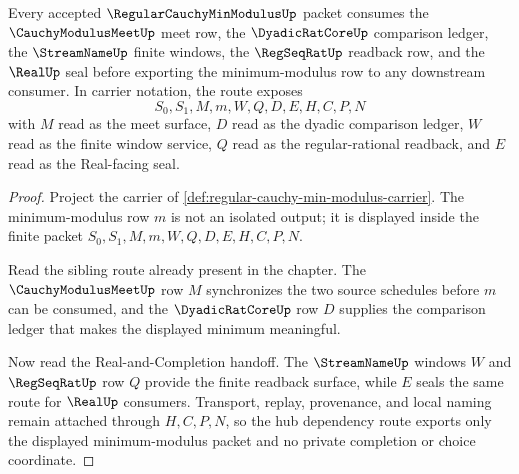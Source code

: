 \begin{theorem}
\label{thm:regular-cauchy-min-modulus-hub-route}
Every accepted $\RegularCauchyMinModulusUp$ packet consumes the $\CauchyModulusMeetUp$ meet row, the $\DyadicRatCoreUp$ comparison ledger, the $\StreamNameUp$ finite windows, the $\RegSeqRatUp$ readback row, and the $\RealUp$ seal before exporting the minimum-modulus row to any downstream consumer. In carrier notation, the route exposes
$$
S_0,S_1,M,m,W,Q,D,E,H,C,P,N
$$
with $M$ read as the meet surface, $D$ read as the dyadic comparison ledger, $W$ read as the finite window service, $Q$ read as the regular-rational readback, and $E$ read as the Real-facing seal.
\end{theorem}
\begin{proof}
Project the carrier of \autoref{def:regular-cauchy-min-modulus-carrier}. The minimum-modulus row $m$ is not an isolated output; it is displayed inside the finite packet $S_0,S_1,M,m,W,Q,D,E,H,C,P,N$.

Read the sibling route already present in the chapter. The $\CauchyModulusMeetUp$ row $M$ synchronizes the two source schedules before $m$ can be consumed, and the $\DyadicRatCoreUp$ row $D$ supplies the comparison ledger that makes the displayed minimum meaningful.

Now read the Real-and-Completion handoff. The $\StreamNameUp$ windows $W$ and $\RegSeqRatUp$ row $Q$ provide the finite readback surface, while $E$ seals the same route for $\RealUp$ consumers. Transport, replay, provenance, and local naming remain attached through $H,C,P,N$, so the hub dependency route exports only the displayed minimum-modulus packet and no private completion or choice coordinate.
\end{proof}

